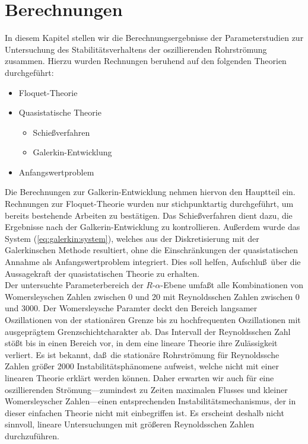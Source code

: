 \documentclass[10pt,a5paper,oneside,draft]{book}
\numberwithin{equation}{chapter}
\begin{document}
\chapter{Berechnungen}\label{sec:berechnungen}
In diesem Kapitel stellen wir die Berechnungsergebnisse der Parameterstudien zur Untersuchung des Stabilit\"atsverhaltens der oszillierenden Rohrstr\"omung zusammen.
Hierzu wurden Rechnungen beruhend auf den folgenden Theorien durchgef\"uhrt:
\begin{itemize}
	\item Floquet-\!Theorie
	\item Quasistatische Theorie
	\begin{itemize}
		\item Schie\ss verfahren
		\item Galerkin-Entwicklung
	\end{itemize}
	\item Anfangswertproblem
\end{itemize}
Die Berechnungen zur Galkerin-Entwicklung nehmen hiervon den Hauptteil ein.
Rechnungen zur Floquet-\!Theorie wurden nur stichpunktartig durchgef\"uhrt, um bereits bestehende Arbeiten zu best\"atigen.
Das Schie\ss verfahren dient dazu, die Ergebnisse nach der Galkerin-Entwicklung zu kontrollieren.
Au\ss erdem wurde das System (\mbox{\ref{eq:galerkin:system}}), welches aus der Diskretisierung mit der Galerkinschen Methode resultiert, ohne die Einschr\"ankungen der quasistatischen Annahme als Anfangswertproblem integriert.
Dies soll helfen, Aufschlu\ss\ \"uber die Aussagekraft der quasistatischen Theorie zu erhalten.\\

Der untersuchte Parameterbereich der $R$-$\alpha$-Ebene umfa\ss t alle Kombinationen von Womersleyschen Zahlen zwischen 0 und 20 mit Reynoldsschen Zahlen zwischen 0 und 3000.
Der Womersleysche Paramter deckt den Bereich langsamer Oszillationen von der station\"aren Grenze bis zu hochfrequenten Oszillationen mit ausgepr\"agtem Grenzschichtcharakter ab.
Das Intervall der Reynoldsschen Zahl st\"o\ss t bis in einen Bereich vor, in dem eine lineare Theorie ihre Zul\"assigkeit verliert.
Es ist bekannt, da\ss\ die station\"are Rohrstr\"omung f\"ur Reynoldssche Zahlen gr\"o\ss er $2000$ Instabilit\"atsph\"anomene aufweist, welche nicht mit einer linearen Theorie erkl\"art werden k\"onnen.
Daher erwarten wir auch f\"ur eine oszillierenden Str\"omung---zumindest zu Zeiten maximalen Flusses und kleiner Womersleyscher Zahlen---einen entsprechenden Instabilit\"atsmechanismus, der in dieser einfachen Theorie nicht mit einbegriffen ist.
Es erscheint deshalb nicht sinnvoll, lineare Untersuchungen mit gr\"o\ss eren Reynoldsschen Zahlen durchzuf\"uhren.\\
\end{document}
